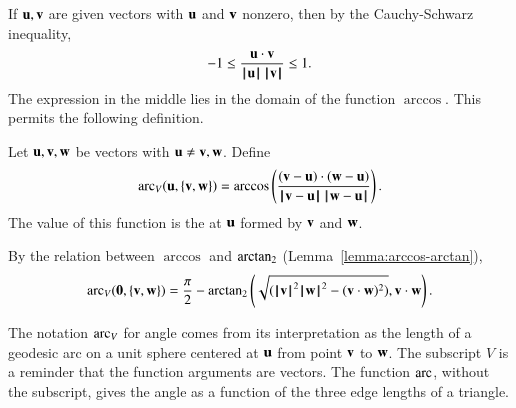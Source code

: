 If ${\mathbf u},{\mathbf v}$ are given vectors with ${\mathbf u}$ and ${\mathbf v}$ nonzero, then by the
Cauchy-Schwarz inequality,
\begin{displaymath}-1 \le \frac{{\mathbf u}\cdot {\mathbf v}}{{{\hskip0.1em|\hskip-0.15em|\hskip0.1em}{\mathbf u}{\hskip0.1em|\hskip-0.15em|\hskip0.1em}}\,{{\hskip0.1em|\hskip-0.15em|\hskip0.1em}{\mathbf v}{\hskip0.1em|\hskip-0.15em|\hskip0.1em}}}
  \le 1.\end{displaymath} The expression in the middle lies in the
domain of the function $\arccos$. This permits the following
definition.  %
%
%

\begin{definition}\label{def:angle}
Let ${\mathbf u},{\mathbf v},{\mathbf w}$ be vectors with ${\mathbf u}\ne {\mathbf v},{\mathbf w}$.
Define 
\begin{displaymath}
  \arc_V(\u,\{\v,\w\}) = \arccos\left(\frac{(\v-\u)\cdot 
(\w-\u)}{\norm{\v}{\u}\,\norm{\w}{\u}}\right).
\end{displaymath}
The value of this function is the  at ${\mathbf u}$ formed by
${\mathbf v}$ and ${\mathbf w}$.  %
%
%
%
%
\end{definition}

By the relation between $\arccos$ and ${\operatorname{arctan_2}}$
(Lemma~\ref{lemma:arccos-arctan}), %
\begin{equation}\label{eqn:angle}
  \operatorname{arc}_V({\mathbf 0},\{{\mathbf v},{\mathbf w}\}) = \frac{\pi}2 - {\operatorname{arctan_2}}\left ({\sqrt{({{\hskip0.1em|\hskip-0.15em|\hskip0.1em}{\mathbf v}{\hskip0.1em|\hskip-0.15em|\hskip0.1em}}^2{{\hskip0.1em|\hskip-0.15em|\hskip0.1em}{\mathbf w}{\hskip0.1em|\hskip-0.15em|\hskip0.1em}}^2 -
        ({\mathbf v}\cdot {\mathbf w})^2)}}, {{\mathbf v}\cdot {\mathbf w}}\right).
\end{equation}
%

The notation $\operatorname{arc}_V$ for angle comes from its interpretation as the
length of a geodesic arc on a unit sphere
centered at ${\mathbf u}$ from point ${\mathbf v}$ to ${\mathbf w}$.
%
The subscript $V$ is a reminder that
the function arguments are vectors.  The function
$\operatorname{arc}$, without the subscript,  gives the angle as a function
of the three edge lengths of a triangle.
%
%
%


